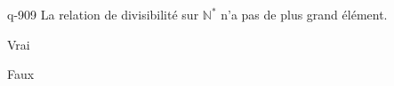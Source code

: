 \begin{truefalse}{q-909}
La relation de divisibilité sur $\mathbb N^*$ n'a pas de plus grand élément.
\item* Vrai
\item Faux
\end{truefalse}


